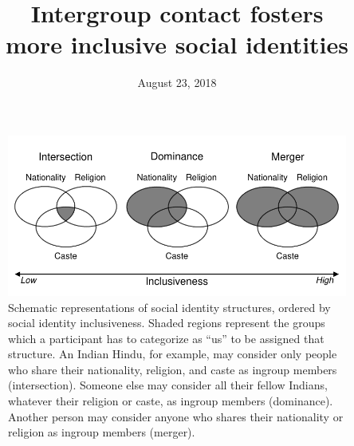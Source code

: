 \documentclass[12pt, a4paper]{article}
\title{Intergroup contact fosters\\more inclusive social identities}
\date{August 23, 2018}
\begin{document}
\begin{figure}
\centering
\includegraphics[scale=1]{../figures/figure-1}
\caption{
Schematic representations of social identity structures, ordered by social identity inclusiveness. Shaded regions represent the groups which a participant has to categorize as ``us'' to be assigned that structure. An Indian Hindu, for example, may consider only people who share their nationality, religion, and caste as ingroup members (intersection). Someone else may consider all their fellow Indians, whatever their religion or caste, as ingroup members (dominance). Another person may consider anyone who shares their nationality or religion as ingroup members (merger).
}
\label{fig:f1}
\end{figure}
\end{document}
